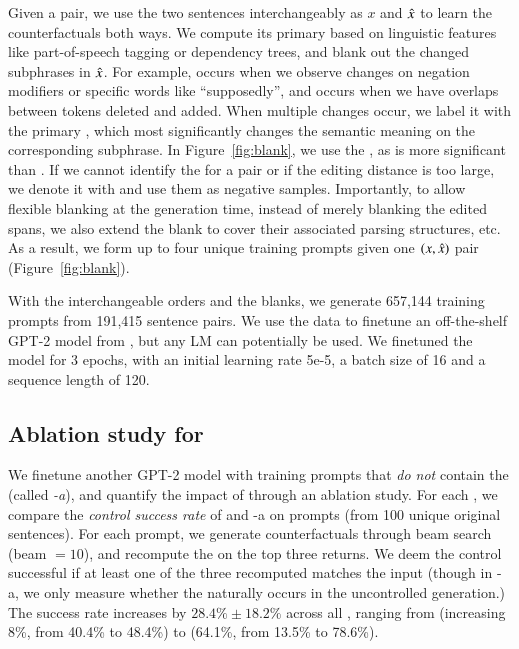 Given a pair, we use the two sentences interchangeably as $x$ and $\hat{x}$ to learn the counterfactuals both ways.
We compute its primary \tagstr based on linguistic features like part-of-speech tagging or dependency trees, and blank out the changed subphrases in $\hat{x}$.
For example,  occurs when we observe changes on negation modifiers or specific words like ``supposedly'', and  occurs when we have overlaps between tokens deleted and added.
When multiple changes occur, we label it with the primary \tagstr, which most significantly changes the semantic meaning on the corresponding subphrase.
In Figure~\ref{fig:blank}, we use the \tagstrshort {}, as  is more significant than .
If we cannot identify the \tagstr for a pair or if the editing distance is too large, we denote it with  and use them as negative samples.
Importantly, to allow flexible blanking at the generation time, instead of merely blanking the edited spans, we also extend the blank to cover their associated parsing structures, etc.
As a result, we form up to four unique training prompts given one $(x, \hat{x})$ pair (Figure~\ref{fig:blank}).


With the interchangeable orders and the blanks, we generate 657,144 training prompts from 191,415 sentence pairs.
We use the data to finetune an off-the-shelf GPT-2 model from \citet{Wolf2019HuggingFacesTS}, but any LM can potentially be used.
We finetuned the model for 3 epochs, with an initial learning rate 5e-5, a batch size of 16 and a sequence length of 120.


\subsection{Ablation study for \tagstrs}
\label{appendix:ablation_control}

We finetune another GPT-2 model with training prompts that \emph{do not} contain the \tagstrshorts (called \emph{\sysname-a}), and quantify the impact of \tagstrs through an ablation study.
For each \tagstr, we compare the \emph{control success rate} of \sysname and \sysname-a on  prompts (from 100 unique original sentences).
For each prompt, we generate counterfactuals through beam search (beam $=10$), and recompute the \tagstrshorts on the top three returns.
We deem the control successful if at least one of the three recomputed \tagstrshort matches the input (though in \sysname-a, we only measure whether the \tagstrshort naturally occurs in the uncontrolled generation.)
The success rate increases by $28.4\% \pm 18.2\%$ across all \tagstrs, ranging from  (increasing 8\%, from 40.4\% to 48.4\%) to  (64.1\%, from 13.5\% to 78.6\%).


